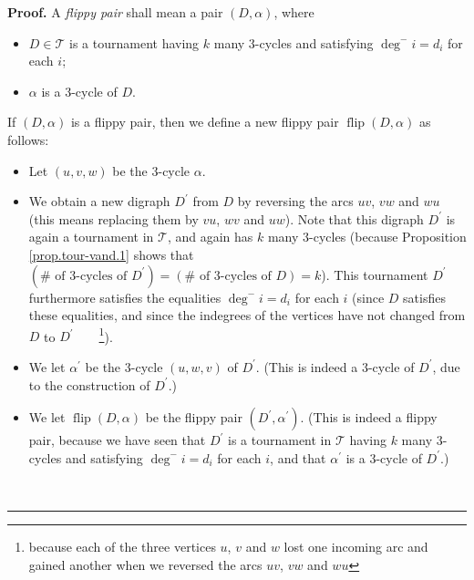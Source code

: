 \documentclass[numbers=enddot,12pt,final,onecolumn,notitlepage]{scrartcl}%
\numberwithin{exer}{subsection}
\theoremstyle{definition}
\newenvironment{proof}[1][Proof]{\noindent\textbf{#1.} }{\ \rule{0.5em}{0.5em}}
\begin{document}
\begin{proof}
A \emph{flippy pair} shall mean a pair $\left(  D,\alpha\right)  $, where

\begin{itemize}
\item $D\in\mathcal{T}$ is a tournament having $k$ many $3$-cycles and
satisfying $\deg^{-}i=d_{i}$ for each $i$;

\item $\alpha$ is a $3$-cycle of $D$.
\end{itemize}

If $\left(  D,\alpha\right)  $ is a flippy pair, then we define a new flippy
pair $\operatorname*{flip}\left(  D,\alpha\right)  $ as follows:

\begin{itemize}
\item Let $\left(  u,v,w\right)  $ be the $3$-cycle $\alpha$.

\item We obtain a new digraph $D^{\prime}$ from $D$ by reversing the arcs
$uv$, $vw$ and $wu$ (this means replacing them by $vu$, $wv$ and $uw$). Note
that this digraph $D^{\prime}$ is again a tournament in $\mathcal{T}$, and
again has $k$ many $3$-cycles (because Proposition \ref{prop.tour-vand.1}
shows that $\left(  \#\text{ of }3\text{-cycles of }D^{\prime}\right)
=\left(  \#\text{ of }3\text{-cycles of }D\right)  =k$). This tournament
$D^{\prime}$ furthermore satisfies the equalities $\deg^{-}i=d_{i}$ for each
$i$ (since $D$ satisfies these equalities, and since the indegrees of the
vertices have not changed from $D$ to $D^{\prime}$\ \ \ \ \footnote{because
each of the three vertices $u$, $v$ and $w$ lost one incoming arc and gained
another when we reversed the arcs $uv$, $vw$ and $wu$}).

\item We let $\alpha^{\prime}$ be the $3$-cycle $\left(  u,w,v\right)  $ of
$D^{\prime}$. (This is indeed a $3$-cycle of $D^{\prime}$, due to the
construction of $D^{\prime}$.)

\item We let $\operatorname*{flip}\left(  D,\alpha\right)  $ be the flippy
pair $\left(  D^{\prime},\alpha^{\prime}\right)  $. (This is indeed a flippy
pair, because we have seen that $D^{\prime}$ is a tournament in $\mathcal{T}$
having $k$ many $3$-cycles and satisfying $\deg^{-}i=d_{i}$ for each $i$, and
that $\alpha^{\prime}$ is a $3$-cycle of $D^{\prime}$.)
\end{itemize}


\end{proof}
\end{document}
